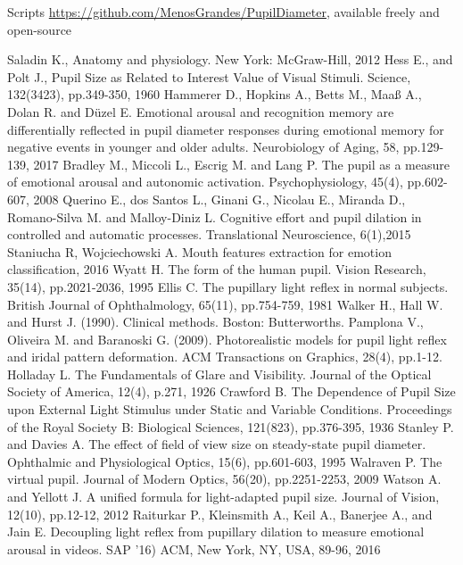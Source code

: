 \documentclass[USenglish,twocolumn]{article}
\begin{document}
Scripts \url{https://github.com/MenosGrandes/PupilDiameter}, available freely and open-source
\begin{thebibliography}{99}
Saladin K.,  Anatomy and physiology. New York: McGraw-Hill, 2012
Hess E., and Polt J.,  Pupil Size as Related to Interest Value of Visual Stimuli. Science, 132(3423), pp.349-350, 1960
Hammerer D., Hopkins A., Betts M., Maaß A., Dolan R. and Düzel E. Emotional arousal and recognition memory are differentially reflected in pupil diameter responses during emotional memory for negative events in younger and older adults. Neurobiology of Aging, 58, pp.129-139, 2017
Bradley M., Miccoli L., Escrig M. and Lang P. The pupil as a measure of emotional arousal and autonomic activation. Psychophysiology, 45(4), pp.602-607, 2008
Querino E., dos Santos L., Ginani G., Nicolau E., Miranda D., Romano-Silva M. and Malloy-Diniz L. Cognitive effort and pupil dilation in controlled and automatic processes. Translational Neuroscience, 6(1),2015
Staniucha R, Wojciechowski A. Mouth features extraction for emotion classification, 2016
Wyatt H. The form of the human pupil. Vision Research, 35(14), pp.2021-2036, 1995
Ellis C. The pupillary light reflex in normal subjects. British Journal of Ophthalmology, 65(11), pp.754-759, 1981
Walker H., Hall W. and Hurst J. (1990). Clinical methods. Boston: Butterworths.
Pamplona V., Oliveira M. and Baranoski G. (2009). Photorealistic models for pupil light reflex and iridal pattern deformation. ACM Transactions on Graphics, 28(4), pp.1-12.
Holladay L. The Fundamentals of Glare and Visibility. Journal of the Optical Society of America, 12(4), p.271, 1926
Crawford B. The Dependence of Pupil Size upon External Light Stimulus under Static and Variable Conditions. Proceedings of the Royal Society B: Biological Sciences, 121(823), pp.376-395, 1936
Stanley P. and Davies A. The effect of field of view size on steady-state pupil diameter. Ophthalmic and Physiological Optics, 15(6), pp.601-603, 1995
Walraven P. The virtual pupil. Journal of Modern Optics, 56(20), pp.2251-2253, 2009
Watson A. and Yellott J. A unified formula for light-adapted pupil size. Journal of Vision, 12(10), pp.12-12, 2012
Raiturkar P., Kleinsmith  A., Keil A., Banerjee A., and Jain E. Decoupling light reflex from pupillary dilation to measure emotional arousal in videos. SAP '16) ACM, New York, NY, USA, 89-96,  2016

\end{thebibliography}
\end{document}
